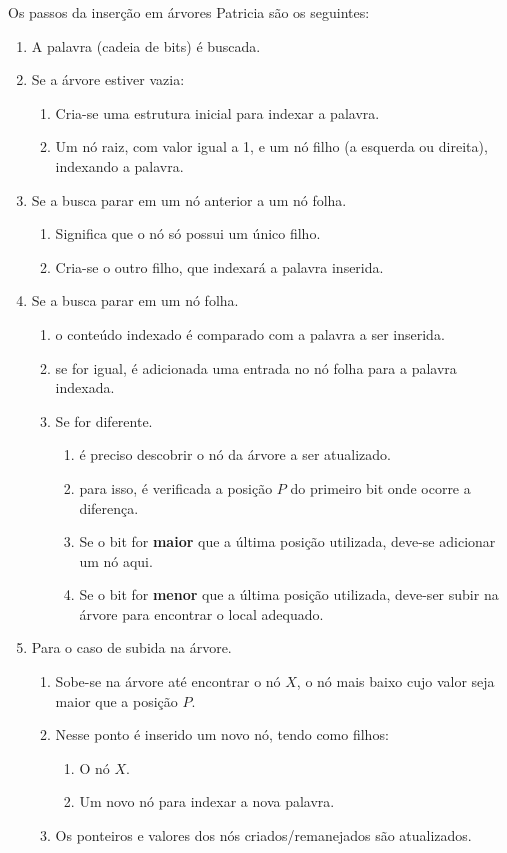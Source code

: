 Os passos da inserção em árvores Patricia são os seguintes:
\begin{enumerate}
\item A palavra (cadeia de bits) é buscada.
\item Se a árvore estiver vazia:
	\begin{enumerate}
	\item Cria-se uma estrutura inicial para indexar a palavra.
	\item Um nó raiz, com valor igual a 1, e um nó filho (a esquerda ou direita), indexando
		a palavra.
	\end{enumerate}
\item Se a busca parar em um nó anterior a um nó folha.
	\begin{enumerate}
	\item Significa que o nó só possui um único filho.
	\item Cria-se o outro filho, que indexará a palavra inserida.
	\end{enumerate}

\item Se a busca parar em um nó folha.
	\begin{enumerate}
	\item o conteúdo indexado é comparado com a palavra a ser inserida.
	\item se for igual, é adicionada uma entrada no nó folha para a palavra indexada.
	\item Se for diferente.
		\begin{enumerate}
		\item é preciso descobrir o nó da árvore a ser atualizado.
		\item para isso, é verificada a posição $P$ do primeiro bit onde ocorre a
			diferença.
		\item Se o bit for {\bf maior} que a última posição utilizada, deve-se adicionar um nó aqui.
		\item Se o bit for {\bf menor}  que a última posição utilizada, deve-ser subir na árvore
			para encontrar o local adequado. 
		\end{enumerate}
	\end{enumerate}

\item Para o caso de subida na árvore.
	\begin{enumerate}
	\item Sobe-se na árvore até encontrar o nó $X$, o nó mais baixo cujo
		valor seja maior que a posição $P$.
	\item Nesse ponto é inserido um novo nó, tendo como filhos:
		\begin{enumerate}
		\item O nó $X$.
		\item Um novo nó para indexar a nova palavra.
		\end{enumerate}
	\item Os ponteiros e valores dos nós criados/remanejados são atualizados.
	\end{enumerate}
	
\end{enumerate}

